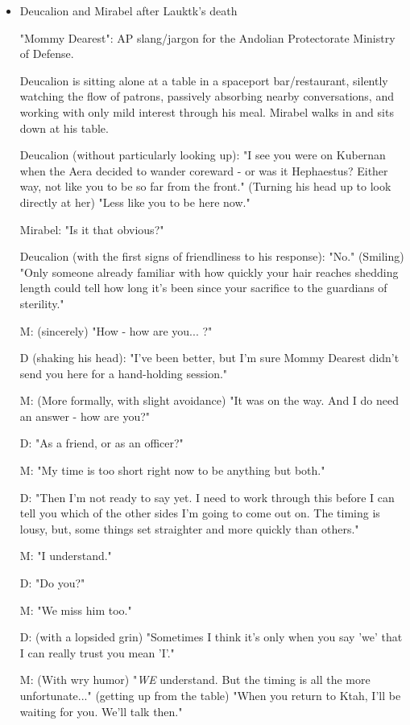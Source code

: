 \begin{itemize}
\item Deucalion and Mirabel after Lauktk's death

"Mommy Dearest": AP slang/jargon for the Andolian Protectorate Ministry of Defense.

Deucalion is sitting alone at a table in a spaceport bar/restaurant,
silently watching the flow of patrons, passively absorbing nearby
conversations, and working with only mild interest through his
meal. Mirabel walks in and sits down at his table.

Deucalion (without particularly looking up): "I see you were on
Kubernan when the Aera decided to wander coreward - or was it
Hephaestus? Either way, not like you to be so far from the front."
(Turning his head up to look directly at her) "Less like you to be
here now."

Mirabel: "Is it that obvious?"

Deucalion (with the first signs of friendliness to his response):
"No." (Smiling) "Only someone already familiar with how quickly your
hair reaches shedding length could tell how long it's been since your
sacrifice to the guardians of sterility."

M: (sincerely) "How - how are you... ?"

D (shaking his head): "I've been better, but I'm sure Mommy Dearest
didn't send you here for a hand-holding session."

M: (More formally, with slight avoidance) "It was on the way. And I do need an answer - how are you?"

D: "As a friend, or as an officer?"

M: "My time is too short right now to be anything but both."

D: "Then I'm not ready to say yet. I need to work through this before
I can tell you which of the other sides I'm going to come out on. The
timing is lousy, but, some things set straighter and more quickly than
others."

M: "I understand."

D: "Do you?"

M: "We miss him too."

D: (with a lopsided grin) "Sometimes I think it's only when you say 'we' that I can really trust you mean 'I'."

M: (With wry humor) "{\em WE} understand. But the timing is all the more unfortunate..." (getting up from the table) "When you return to Ktah, I'll be waiting for you. We'll talk then."


\end{itemize}
